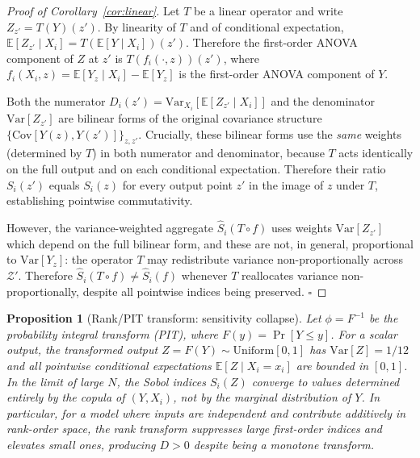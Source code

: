 \documentclass[11pt,onecolumn]{article}
\newtheorem{proposition}{Proposition}
\begin{document}
\begin{proof}[Proof of Corollary~\ref{cor:linear}]
Let $T$ be a linear operator and write $Z_{z'} = T(Y)(z')$.  By linearity of
$T$ and of conditional expectation,
$\mathbb{E}[Z_{z'}\mid X_i] = T(\mathbb{E}[Y\mid X_i])(z')$.
Therefore the first-order ANOVA component of $Z$ at $z'$ is
$T(f_i(\cdot, z))(z')$, where $f_i(X_i, z) = \mathbb{E}[Y_z\mid X_i] - \mathbb{E}[Y_z]$
is the first-order ANOVA component of $Y$.

Both the numerator $D_i(z') = \mathrm{Var}_{X_i}[\mathbb{E}[Z_{z'}\mid X_i]]$
and the denominator $\mathrm{Var}[Z_{z'}]$ are bilinear forms of the original
covariance structure $\{\mathrm{Cov}[Y(z), Y(z')]\}_{z,z'}$.  Crucially, these
bilinear forms use the \emph{same} weights (determined by $T$) in both
numerator and denominator, because $T$ acts identically on the full output
and on each conditional expectation.  Therefore their ratio $S_i(z')$ equals
$S_i(z)$ for every output point $z'$ in the image of $z$ under $T$, establishing
pointwise commutativity.

However, the variance-weighted aggregate $\hat{S}_i(T \circ f)$ uses weights
$\mathrm{Var}[Z_{z'}]$ which depend on the full bilinear form, and these are
not, in general, proportional to $\mathrm{Var}[Y_z]$: the operator $T$ may
redistribute variance non-proportionally across $\mathcal{Z}'$.
Therefore $\hat{S}_i(T \circ f) \neq \hat{S}_i(f)$ whenever $T$ reallocates
variance non-proportionally, despite all pointwise indices being preserved.
$\square$
\end{proof}

\begin{proposition}[Rank/PIT transform: sensitivity collapse]
\label{prop:rank}
Let $\phi = F^{-1}$ be the probability integral transform (PIT), where
$F(y) = \Pr[Y \leq y]$.  For a scalar output, the transformed output
$Z = F(Y) \sim \mathrm{Uniform}[0,1]$ has $\mathrm{Var}[Z] = 1/12$ and
all pointwise conditional expectations $\mathbb{E}[Z \mid X_i = x_i]$
are bounded in $[0,1]$.  In the limit of large $N$, the Sobol indices
$S_i(Z)$ converge to values determined entirely by the copula of $(Y, X_i)$,
not by the marginal distribution of $Y$.  In particular, for a model where
inputs are independent and contribute additively in rank-order space, the
rank transform suppresses large first-order indices and elevates small ones,
producing $D > 0$ despite being a monotone transform.
\end{proposition}
\end{document}

